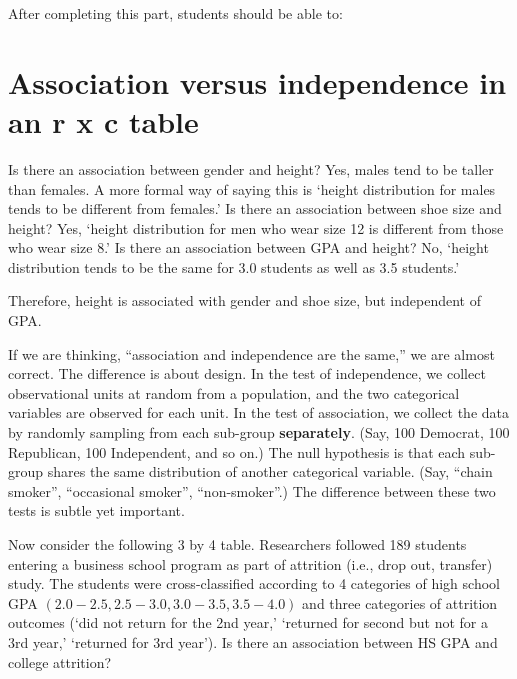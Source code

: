 \documentclass[11pt, chapterprefix=true]{scrbook}\usepackage[]{graphicx}\usepackage[]{color}
\begin{document}
After completing this part, students should be able to:


\section{Association versus independence in an r x c table}  

Is there an association between gender and height?  Yes, males tend to be taller than females.  A more formal way of saying this is `height distribution for males tends to be different from females.'   Is there an association between shoe size and height?  Yes,  `height distribution for men who wear size 12 is different from those who wear size 8.'    Is there an association between GPA and height?  No, `height distribution tends to be the same for 3.0 students as well as 3.5 students.'


Therefore, height is associated with gender and shoe size, but independent of GPA.  

If we are thinking, ``association and independence are the same,''  we are almost correct.  The difference is about design. In the test of independence, we collect observational units at random from a population, and the two categorical variables are observed for each unit. In the test of association, we collect the data by randomly sampling from each sub-group \textbf{separately}. (Say, 100 Democrat, 100 Republican, 100 Independent, and so on.) The null hypothesis is that each sub-group shares the same distribution of another categorical variable. (Say, ``chain smoker'', ``occasional smoker'', ``non-smoker''.)  The difference between these two tests is subtle yet important.

Now consider the following 3 by 4 table.  Researchers followed 189 students entering a business school program as part of attrition (i.e., drop out, transfer) study.  The students were cross-classified according to 4 categories of high school GPA $(2.0-2.5, 2.5-3.0, 3.0-3.5, 3.5-4.0)$ and three categories of attrition outcomes (`did not return for the 2nd year,' `returned for second but not for a 3rd year,' `returned for 3rd year').  Is there an association between HS GPA and college attrition?
\end{document}
